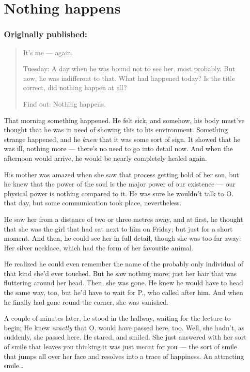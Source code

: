 \chapter{Nothing happens}
\label{cha:nothing-happens}
\subsection*{Originally published: }
\begin{quote}
It's me --- again. 

Tuesday: A day when he was bound not to see her, most probably. 
But now, he was indifferent to that. 
What had happened today?
Is the title correct, did nothing happen at all?

Find out: Nothing happens.
\end{quote}

That morning something happened. 
He felt sick, and somehow, his body must've thought that he was in need of showing this to his environment. Something strange happened, and he \emph{knew} that it was some sort of sign. 
It showed that he was ill, nothing more --- there's no need to go into detail now. 
And when the afternoon would arrive, he would be nearly completely healed again.

His mother was amazed when she saw that process getting hold of her son, but he knew that the power of the soul is the major power of our existence --- our physical power is nothing compared to it. 
He was sure he wouldn't talk to O. that day, but some communication took place, nevertheless.

He saw her from a distance of two or three metres away, and at first, he thought that she was the girl that had sat next to him on Friday; but just for a short moment. And then, he could see her in full detail, though she was too far away: Her silver necklace, which had the form of her favourite animal.

He realized he could even remember the name of the probably only individual of that kind she'd ever touched. 
But he saw nothing more; just her hair that was fluttering around her head. Then, she was gone. He knew he would have to head the same way, too, but he'd have to wait for P., who called after him. And when he finally had gone round the corner, she was vanished.

A couple of minutes later, he stood in the hallway, waiting for the lecture to begin; He knew \emph{exactly} that O. would have passed here, too. 
Well, she hadn't, as suddenly, she passed here. He stared, and smiled. She just answered with her sort of smile that leaves you thinking it was just meant for you --- the sort of smile that jumps all over her face and resolves into a trace of happiness. 
An attracting smile\ldots

